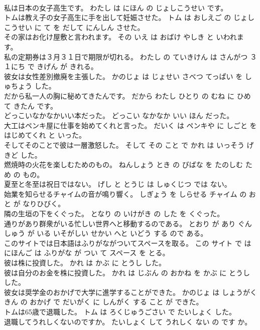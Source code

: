 \documentclass[8pt]{extreport}
\begin{document}
\begin{CJK}{UTF8}{min}
\\	私は日本の女子高生です。	わたし は にほん の じょしこうせい です。	
\\	トムは教え子の女子高生に手を出して妊娠させた。	トム は おしえご の じょしこうせい に て を だして にんしん させた。	
\\	その家はお化け屋敷と言われます。	その いえ は おばけ やしき と いわれます。	
\\	私の定期券は３月３１日で期限が切れる。	わたし の ていきけん は さんがつ ３１にち で きげん が きれる。	
\\	彼女は女性差別撤廃を主張した。	かのじょ は じょせい さべつ てっぱい を しゅちょう した。	
\\	だから私一人の胸に秘めてきたんです。	だから わたし ひとり の むね に ひめて きたん です。	
\\	どっこいなかなかいい本だった。	どっこい なかなか いい ほん だった。	
\\	大工はペンキ屋に仕事を始めてくれと言った。	だいく は ペンキや に しごと を はじめてくれ と いった。	
\\	そしてそのことで彼は一層激怒した。	そして その こと で かれ は いっそう げきど した。	
\\	燃焼時の火花を楽しむためのもの。	ねんしょう とき の びばな を たのしむ ため の もの。	
\\	夏至と冬至は祝日ではない。	げし と とうじ は しゅくじつ では ない。	
\\	始業を知らせるチャイムの音が鳴り響く。	しぎょう を しらせる チャイム の おと が なりひびく。	
\\	隣の生垣の下をくぐった。	となり の いけがき の した を くぐった。	
\\	通りがあり群衆がいる忙しい世界へと移動するのである。	とおり が あり ぐんしゅう が いる いそがしい せかい へと いどう する ので ある。	
\\	このサイトでは日本語はふりがながついてスペースを取る。	この サイト で は にほんご は ふりがな が つい て スペース を とる。	
\\	彼は株に投資した。	かれ は かぶ に とうし した。	
\\	彼は自分のお金を株に投資した。	かれ は じぶん の おかね を かぶ に とうし した。	
\\	彼女は奨学金のおかげで大学に進学することができた。	かのじょ は しょうがくきん の おかげ で だいがく に しんがく する こと が できた。	
\\	トムは65歳で退職した。	トム は ろくじゅうごさい で たいしょく した。	
\\	退職してうれしくないのですか。	たいしょく して うれしく ない の です か。	

\end{CJK}
\end{document}
